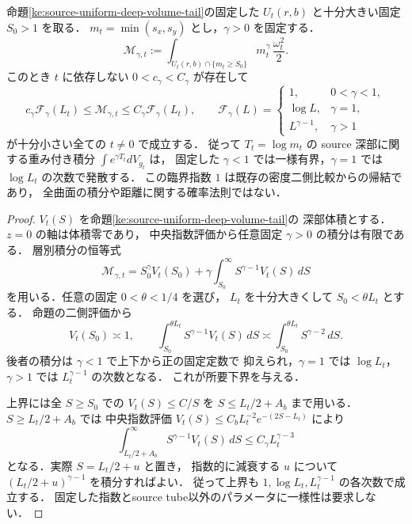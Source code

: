 \begin{corollary}
\label{ke:source-depth-critical-moments}
命題\ref{ke:source-uniform-deep-volume-tail}の固定した
$U_t(r,b)$ と十分大きい固定 $S_0>1$ を取る．
$m_t=\min(s_x,s_y)$ とし，$\gamma>0$ を固定する．
\[
 \mathcal M_{\gamma,t}:=
 \int_{U_t(r,b)\cap\{m_t\ge S_0\}}
   m_t^\gamma\,\frac{\omega_t^2}{2}.
\]
このとき $t$ に依存しない $0<c_\gamma<C_\gamma$ が存在して
\begin{equation}\label{ke:eq:source-depth-critical-moments}
 c_\gamma \mathcal F_\gamma(L_t)
 \le\mathcal M_{\gamma,t}
 \le C_\gamma\mathcal F_\gamma(L_t),\qquad
 \mathcal F_\gamma(L)=
 \begin{cases}
  1,&0<\gamma<1,\\
  \log L,&\gamma=1,\\
  L^{\gamma-1},&\gamma>1
 \end{cases}
\end{equation}
が十分小さい全ての $t\ne0$ で成立する．
従って $T_t=\log m_t$ の source 深部に関する重み付き積分
$\int e^{\gamma T_t}dV_{g_t}$ は，
固定した $\gamma<1$ では一様有界，$\gamma=1$ では
$\log L_t$ の次数で発散する．
この臨界指数 $1$ は既存の密度二側比較からの帰結であり，
全曲面の積分や距離に関する確率法則ではない．
\end{corollary}
\begin{proof}
$V_t(S)$ を命題\ref{ke:source-uniform-deep-volume-tail}の
深部体積とする．$z=0$ の軸は体積零であり，
中央指数評価から任意固定 $\gamma>0$ の積分は有限である．
層別積分の恒等式
\begin{equation}\label{ke:eq:source-moment-layer-cake}
 \mathcal M_{\gamma,t}
 =S_0^\gamma V_t(S_0)
  +\gamma\int_{S_0}^{\infty}S^{\gamma-1}V_t(S)\,dS
\end{equation}
を用いる．任意の固定 $0<\theta<1/4$ を選び，
$L_t$ を十分大きくして $S_0<\theta L_t$ とする．
命題の二側評価から
\[
 V_t(S_0)\asymp1,\qquad
 \int_{S_0}^{\theta L_t}S^{\gamma-1}V_t(S)\,dS
 \asymp\int_{S_0}^{\theta L_t}S^{\gamma-2}\,dS .
\]
後者の積分は $\gamma<1$ で上下から正の固定定数で
抑えられ，$\gamma=1$ では $\log L_t$，
$\gamma>1$ では $L_t^{\gamma-1}$ の次数となる．
これが所要下界を与える．

上界には全 $S\ge S_0$ での $V_t(S)\le C/S$ を
$S\le L_t/2+A_b$ まで用いる．$S\ge L_t/2+A_b$ では
中央指数評価
$V_t(S)\le C_b L_t^{-2}e^{-(2S-L_t)}$ により
\[
 \int_{L_t/2+A_b}^\infty
   S^{\gamma-1}V_t(S)\,dS
 \le C_\gamma L_t^{\gamma-3}
\]
となる．実際 $S=L_t/2+u$ と置き，
指数的に減衰する $u$ について
$(L_t/2+u)^{\gamma-1}$ を積分すればよい．
従って上界も
$1,\log L_t,L_t^{\gamma-1}$ の各次数で成立する．
固定した指数とsource tube以外のパラメータに一様性は要求しない．
\end{proof}

